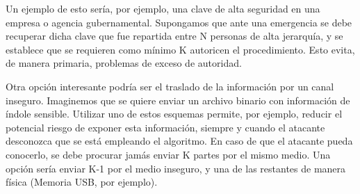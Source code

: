 \documentclass[11pt]{scrartcl} %
\begin{document}
Un ejemplo de esto sería, por ejemplo, una clave de alta seguridad en una empresa o agencia gubernamental. Supongamos que ante una emergencia se debe recuperar dicha clave que fue repartida entre N personas de alta jerarquía, y se establece que se requieren como mínimo K autoricen el procedimiento. Esto evita, de manera primaria, problemas de exceso de autoridad.

Otra opción interesante podría ser el traslado de la información por un canal inseguro. Imaginemos que se quiere enviar un archivo binario con información de índole sensible. Utilizar uno de estos esquemas permite, por ejemplo, reducir el potencial riesgo de exponer esta información, siempre y cuando el atacante desconozca que se está empleando el algoritmo. En caso de que el atacante pueda conocerlo, se debe procurar jamás enviar K partes por el mismo medio. Una opción sería enviar K-1 por el medio inseguro, y una de las restantes de manera física (Memoria USB, por ejemplo).

\end{document}
